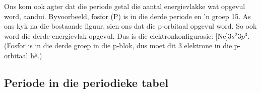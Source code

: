\begin{figure}[H]
 \begin{center}
 \end{center}
\end{figure}
Ons kom ook agter dat die periode getal die aantal energievlakke wat opgevul word, aandui. Byvoorbeeld, fosfor ($\text{P}$) is in die derde periode en 'n groep 15. As ons kyk na die bostaande figuur, sien ons dat die p-orbitaal opgevul word. So ook word die derde energievlak opgevul. Dus is die elektronkonfigurasie: $\text{[Ne]}3s^{2}3p^{3}$. (Fosfor is in die derde groep in die p-blok, dus moet dit 3 elektrone in die p-orbitaal h\^{e}.)
      \label{m38760*uid146}
            \subsection*{Periode in die periodieke tabel}
            \nopagebreak

